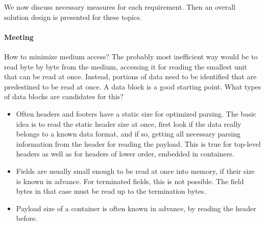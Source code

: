 We now discuss necessary measures for each requirement. Then an overall solution design is presented for these topics.


\paragraph{Meeting \REQUcrlOptMediumAccess{}}
\label{sec:MeetingOptimizeMediumAccess}

How to minimize medium access? The probably most inefficient way would be to read byte by byte from the medium, accessing it for reading the smallest unit that can be read at once. Instead, portions of data need to be identified that are predestined to be read at once. A data block is a good starting point. What types of data blocks are candidates for this?
\begin{itemize}
	\item Often headers and footers have a static size for optimized parsing. The basic idea is to read the static header size at once, first look if the data really belongs to a known data format, and if so, getting all necessary parsing information from the header for reading the payload. This is true for top-level headers as well as for headers of lower order, embedded in containers.
	\item Fields are usually small enough to be read at once into memory, if their size is known in advance. For terminated fields, this is not possible. The field bytes in that case must be read up to the termination bytes.
	\item Payload size of a container is often known in advance, by reading the header before.
\end{itemize}

